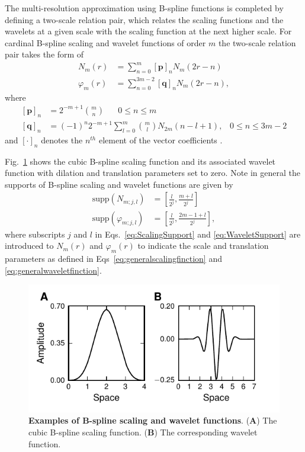 \documentclass[review,authoryear,3p]{elsarticle}
\begin{document}
The multi-resolution approximation using B-spline functions is completed by defining a two-scale relation pair, which relates the scaling functions and the wavelets at a given scale with the scaling function at the next higher scale. For cardinal B-spline scaling and wavelet functions of order $m$ the two-scale relation pair takes the form of
\begin{align}
 N_{m}\left(r\right)&=\sum_{n=0}^{m} \left[\mathbf p\right]_n N_{m}\left(2r-n\right) \label{eq:MRA-TwoScalepair1} \\
  \varphi_{m}\left(r\right) &= \sum_{n=0}^{3m-2}  \left[\mathbf q\right]_n N_{m}\left(2r-n\right)\label{eq:MRA-TwoScalepair2},
 \end{align}
where 
 \begin{align}
\left[\mathbf p\right]_n&=2^{-m+1} \binom{m}{n} \quad \text{ $0\le n\le m$} \label{eq:MRA-TwoScalepair1coefs}\\
\left[\mathbf q\right]_n&= \left(-1\right)^n{2^{-m+1}}\sum_{l=0}^{m} \binom{m}{l} N_{2m}\left(n-l+1\right), \,  \text{ $0\le n\le 3m-2$}\label{eq:MRA-TwoScalepair2coefs}
 \end{align}
and $\left[\cdot\right]_n$ denotes the $n^{th}$ element of the vector coefficients \citep{Chui1992}.

Fig.~\ref{fig:MRA-Figure1} shows the cubic B-spline scaling function and its associated wavelet function with dilation and translation parameters set to zero. Note in general the supports of B-spline scaling and wavelet functions are given by 
\begin{align}
	\mathrm{supp}(N_{m;j,l})&=\left[\frac{l}{2^j},\frac{m+l}{2^j}\right] \label{eq:ScalingSupport}\\  
  \mathrm{supp}(\varphi_{m;j,l})&=\left[\frac{l}{2^j},\frac{2m-1+l}{2^j}\right],\label{eq:WaveletSupport}
	\end{align}    
where subscripts $j$ and $l$ in Eqs.~\eqref{eq:ScalingSupport} and \eqref{eq:WaveletSupport} are introduced to $N_{m}(r)$ and $\varphi_{m}(r)$ to indicate the scale and translation parameters as defined in Eqs~\eqref{eq:generalscalingfinction} and \eqref{eq:generalwaveletfinction}.
\begin{figure}[!t]
\centering
\includegraphics{./Graph/fig4.pdf}
\caption{{\bf Examples of B-spline scaling and wavelet functions}. (\textbf{A}) The cubic B-spline scaling function. (\textbf{B}) The corresponding wavelet function.}
\label{fig:MRA-Figure1}
\end{figure}
 
\end{document}
